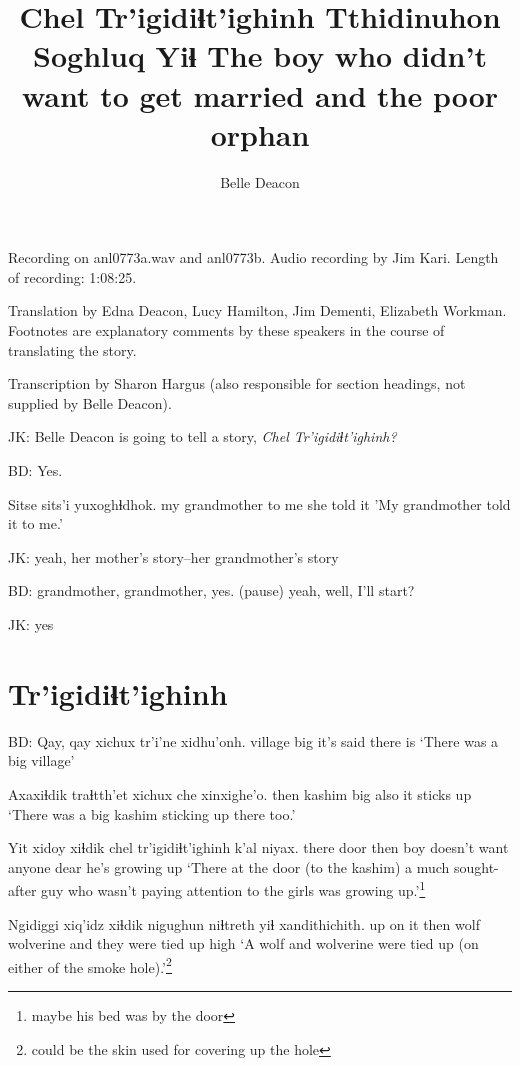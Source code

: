 \documentclass[12pt]{article}
\begin{document}
\title{Chel Tr'igidiɬt'ighinh Tthidinuhon Soghluq Yiɬ \newline The boy who didn't want to get married and the poor orphan}
\author{Belle Deacon}
\date{}
\maketitle

Recording on anl0773a.wav and anl0773b. Audio recording by Jim Kari. Length of
recording:  1:08:25.

Translation by Edna Deacon, Lucy Hamilton, Jim Dementi, Elizabeth
Workman. Footnotes are explanatory comments by these speakers in the
course of translating the story.

Transcription by Sharon Hargus (also responsible for section headings, not supplied by Belle Deacon).

JK:  Belle Deacon is going to tell a story, \em Chel Tr'igidiɬt'ighinh\em ?

BD:  Yes. 

\gll Sitse          sits'i yuxoghɬdhok.
{my grandmother} {to me}  {she told it}
\glt 'My grandmother told it to me.'
\glend

JK:  yeah, her mother's story--her grandmother's story

BD:  grandmother, grandmother, yes. (pause) yeah, well, I'll start?

JK:  yes

\section*{Tr'igidiɬt'ighinh}

BD:
\gll Qay,    qay xichux tr'i'ne   xidhu'onh.
village {}    big    {it's said} {there is}
\glt `There was a big village'
\glend

\gll Axaxiɬdik traɬtth'et xichux che  xinxighe'o. 
then      kashim     big    also {it sticks up}
\glt `There was a big kashim sticking up there too.'
\glend

\gll Yit   xidoy xiɬdik chel tr'igidiɬt'ighinh   k'al     niyax.
there door  then   boy  {doesn't want anyone} dear {he's growing up}
\glt `There at the door (to the kashim) a much sought-after guy who wasn't paying attention to the girls was growing up.'\footnote{maybe his bed was by the door}
\glend

\gll Ngidiggi xiq'idz xiɬdik nigughun niɬtreth  yiɬ xandithichith.
up      {on it}   then   wolf     wolverine and {they were tied up high}
\glt `A wolf and wolverine were tied up (on either of the smoke hole).'\footnote{could be the skin used for covering up the hole}
\glend
\end{document}
